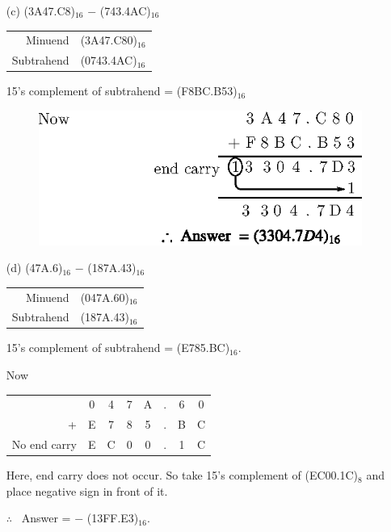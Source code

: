 \begin{solution}
\begin{itemize}
\eject

\item[(c)] (3A47.C8)$_{16}$ $-$ (743.4AC)$_{16}$
\begin{center}
\begin{tabular}{r@{\;=\;}l}
Minuend & (3A47.C80)$_{16}$\\[3pt]
Subtrahend & (0743.4AC)$_{16}$
\end{tabular}
\end{center}
15's complement of subtrahend = (F8BC.B53)$_{16}$
\begin{figure}[H]
\centering
\includegraphics{chap5/div52.eps}
\end{figure}

\item[(d)] (47A.6)$_{16}$ $-$ (187A.43)$_{16}$
\begin{center}
\begin{tabular}{r@{\;=\;}l}
Minuend & (047A.60)$_{16}$\\[3pt]
Subtrahend & (187A.43)$_{16}$
\end{tabular}
\end{center}
15's complement of subtrahend = (E785.BC)$_{16}$.

Now
\begin{center}
\tabcolsep=4pt
\begin{tabular}{rccccccc}
 & 0 & 4 & 7 & A & . & 6 & 0\\
+ & E & 7 & 8 & 5 & . & B & C\\
\cline{2-8}
No end carry & E & C & 0 & 0 & . & 1 & C
\end{tabular}
\end{center}
Here, end carry does not occur. So take 15's complement of (EC00.1C)$_{8}$ and place negative sign in front of it.

$\therefore$~ Answer = $-$ (13FF.E3)$_{16}$.
\end{itemize}
\end{solution}

